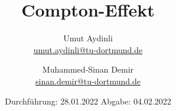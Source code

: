 

\subject{V603}
\title{Compton-Effekt}
\author{Umut Aydinli \\
 \href{mailto:umut.aydinli@tu-dortmund.de}{umut.aydinli@tu-dortmund.de}
 \and Muhammed-Sinan Demir \\
 \href{mailto:sinan.demir@tu-dortmund.de}{sinan.demir@tu-dortmund.de}
 }
\date{
  Durchführung: 28.01.2022
  \hspace{3em}
  Abgabe: 04.02.2022
}




\maketitle
\tableofcontents
\newpage








\nocite{*}
\printbibliography{}


